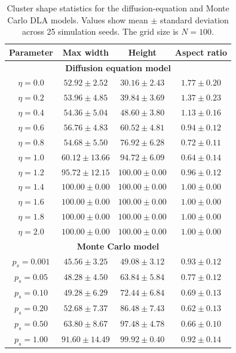 \documentclass[10pt, journal]{IEEEtran}
\begin{document}
\begin{table}[h]
\centering
\label{tab:shape_comparison}
\begin{tabular}{cccc}
\toprule
Parameter & Max width & Height & Aspect ratio \\
\midrule
\multicolumn{4}{c}{\textbf{Diffusion equation model}} \\
\midrule
$\eta = 0.0$ & $52.92 \pm 2.52$ & $30.16 \pm 2.43$ & $1.77 \pm 0.20$ \\
$\eta = 0.2$ & $53.96 \pm 4.85$ & $39.84 \pm 3.69$ & $1.37 \pm 0.23$ \\
$\eta = 0.4$ & $54.36 \pm 5.04$ & $48.60 \pm 3.80$ & $1.13 \pm 0.16$ \\
$\eta = 0.6$ & $56.76 \pm 4.83$ & $60.52 \pm 4.81$ & $0.94 \pm 0.12$ \\
$\eta = 0.8$ & $54.68 \pm 5.50$ & $76.92 \pm 6.28$ & $0.72 \pm 0.11$ \\
$\eta = 1.0$ & $60.12 \pm 13.66$ & $94.72 \pm 6.09$ & $0.64 \pm 0.14$ \\
$\eta = 1.2$ & $95.72 \pm 12.15$ & $100.00 \pm 0.00$ & $0.96 \pm 0.12$ \\
$\eta = 1.4$ & $100.00 \pm 0.00$ & $100.00 \pm 0.00$ & $1.00 \pm 0.00$ \\
$\eta = 1.6$ & $100.00 \pm 0.00$ & $100.00 \pm 0.00$ & $1.00 \pm 0.00$ \\
$\eta = 1.8$ & $100.00 \pm 0.00$ & $100.00 \pm 0.00$ & $1.00 \pm 0.00$ \\
$\eta = 2.0$ & $100.00 \pm 0.00$ & $100.00 \pm 0.00$ & $1.00 \pm 0.00$ \\

\midrule
\multicolumn{4}{c}{\textbf{Monte Carlo model}} \\
\midrule
$p_s = 0.001$ & $45.56 \pm 3.25$ & $49.08 \pm 3.12$ & $0.93 \pm 0.12$ \\
$p_s = 0.05$ & $48.28 \pm 4.50$ & $63.84 \pm 5.84$ & $0.77 \pm 0.12$ \\
$p_s = 0.10$ & $49.28 \pm 6.29$ & $72.44 \pm 6.84$ & $0.69 \pm 0.13$ \\
$p_s = 0.20$ & $52.68 \pm 7.37$ & $86.48 \pm 7.43$ & $0.62 \pm 0.13$ \\
$p_s = 0.50$ & $63.80 \pm 8.67$ & $97.48 \pm 4.78$ & $0.66 \pm 0.10$ \\
$p_s = 1.00$ & $91.60 \pm 14.49$ & $99.92 \pm 0.40$ & $0.92 \pm 0.14$ \\
\bottomrule
\end{tabular}
\caption{Cluster shape statistics for the diffusion-equation and Monte Carlo DLA models. 
Values show mean $\pm$ standard deviation across 25 simulation seeds. 
The grid size is $N=100$.}
\end{table}
\end{document}
